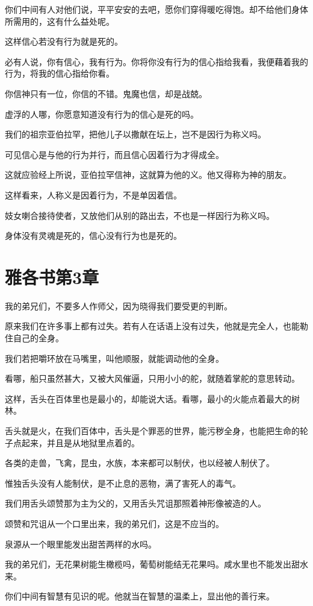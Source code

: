 \documentclass[12pt,oneside]{book}
\begin{document}
你们中间有人对他们说，平平安安的去吧，愿你们穿得暖吃得饱。却不给他们身体所需用的，这有什么益处呢。

这样信心若没有行为就是死的。

必有人说，你有信心，我有行为。你将你没有行为的信心指给我看，我便藉着我的行为，将我的信心指给你看。

你信神只有一位，你信的不错。鬼魔也信，却是战兢。

虚浮的人哪，你愿意知道没有行为的信心是死的吗。

我们的祖宗亚伯拉罕，把他儿子以撒献在坛上，岂不是因行为称义吗。

可见信心是与他的行为并行，而且信心因着行为才得成全。

这就应验经上所说，亚伯拉罕信神，这就算为他的义。他又得称为神的朋友。

这样看来，人称义是因着行为，不是单因着信。

妓女喇合接待使者，又放他们从别的路出去，不也是一样因行为称义吗。

身体没有灵魂是死的，信心没有行为也是死的。

\chapter{雅各书第3章}
我的弟兄们，不要多人作师父，因为晓得我们要受更的判断。

原来我们在许多事上都有过失。若有人在话语上没有过失，他就是完全人，也能勒住自己的全身。

我们若把嚼环放在马嘴里，叫他顺服，就能调动他的全身。

看哪，船只虽然甚大，又被大风催逼，只用小小的舵，就随着掌舵的意思转动。

这样，舌头在百体里也是最小的，却能说大话。看哪，最小的火能点着最大的树林。

舌头就是火，在我们百体中，舌头是个罪恶的世界，能污秽全身，也能把生命的轮子点起来，并且是从地狱里点着的。

各类的走兽，飞禽，昆虫，水族，本来都可以制伏，也以经被人制伏了。

惟独舌头没有人能制伏，是不止息的恶物，满了害死人的毒气。

我们用舌头颂赞那为主为父的，又用舌头咒诅那照着神形像被造的人。

颂赞和咒诅从一个口里出来，我的弟兄们，这是不应当的。

泉源从一个眼里能发出甜苦两样的水吗。

我的弟兄们，无花果树能生橄榄吗，葡萄树能结无花果吗。咸水里也不能发出甜水来。

你们中间有智慧有见识的呢。他就当在智慧的温柔上，显出他的善行来。
\end{document}
